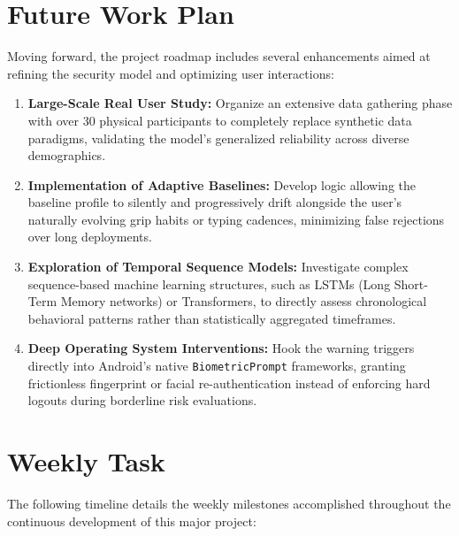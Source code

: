 \documentclass[12pt,a4paper]{report}
\begin{document}
\chapter{Future Work Plan}

Moving forward, the project roadmap includes several enhancements aimed at refining the security model and optimizing user interactions:

\begin{enumerate}
    \item \textbf{Large-Scale Real User Study:} Organize an extensive data gathering phase with over 30 physical participants to completely replace synthetic data paradigms, validating the model's generalized reliability across diverse demographics.
    \item \textbf{Implementation of Adaptive Baselines:} Develop logic allowing the baseline profile to silently and progressively drift alongside the user's naturally evolving grip habits or typing cadences, minimizing false rejections over long deployments.
    \item \textbf{Exploration of Temporal Sequence Models:} Investigate complex sequence-based machine learning structures, such as LSTMs (Long Short-Term Memory networks) or Transformers, to directly assess chronological behavioral patterns rather than statistically aggregated timeframes.
    \item \textbf{Deep Operating System Interventions:} Hook the warning triggers directly into Android's native \texttt{BiometricPrompt} frameworks, granting frictionless fingerprint or facial re-authentication instead of enforcing hard logouts during borderline risk evaluations.
\end{enumerate}

\chapter{Weekly Task}

The following timeline details the weekly milestones accomplished throughout the continuous development of this major project:
\end{document}
